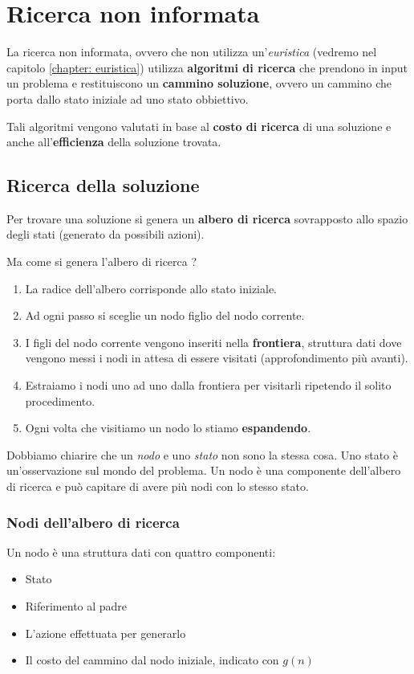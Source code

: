 \chapter{Ricerca non informata} \label{chapter: ricerca non informata}
La ricerca non informata, ovvero che non utilizza un'\emph{euristica} (vedremo nel capitolo
\ref{chapter: euristica}) utilizza \textbf{algoritmi di ricerca} che prendono in input un
problema e restituiscono un \textbf{cammino soluzione}, ovvero un cammino che porta dallo
stato iniziale ad uno stato obbiettivo.

Tali algoritmi vengono valutati in base al \textbf{costo di ricerca} di una soluzione e anche
all'\textbf{efficienza} della soluzione trovata.

\section{Ricerca della soluzione}
Per trovare una soluzione si genera un \textbf{albero di ricerca} sovrapposto allo spazio
degli stati (generato da possibili azioni).

Ma come si genera l'albero di ricerca ?
\begin{enumerate}
	\item La radice dell'albero corrisponde allo stato iniziale.
	\item Ad ogni passo si sceglie un nodo figlio del nodo corrente.
	\item I figli del nodo corrente vengono inseriti nella \textbf{frontiera}, struttura
	      dati dove vengono messi i nodi in attesa di essere visitati (approfondimento
	      pi\`u avanti).
	\item Estraiamo i nodi uno ad uno dalla frontiera per visitarli ripetendo il solito
	      procedimento.
	\item Ogni volta che visitiamo un nodo lo stiamo \textbf{espandendo}.
\end{enumerate}
Dobbiamo chiarire che un \emph{nodo} e uno \emph{stato} non sono la stessa cosa. Uno stato
\`e un'osservazione sul mondo del problema. Un nodo \`e una componente dell'albero di
ricerca e pu\`o capitare di avere pi\`u nodi con lo stesso stato.

\subsection{Nodi dell'albero di ricerca}
Un nodo \`e una struttura dati con quattro componenti:
\begin{itemize}
	\item Stato
	\item Riferimento al padre
	\item L'azione effettuata per generarlo
	\item Il costo del cammino dal nodo iniziale, indicato con $g(n)$
\end{itemize}

